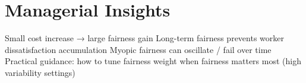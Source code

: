 \section{Managerial Insights}
Small cost increase → large fairness gain
Long-term fairness prevents worker dissatisfaction accumulation
Myopic fairness can oscillate / fail over time
Practical guidance:
how to tune fairness weight
when fairness matters most (high variability settings)

